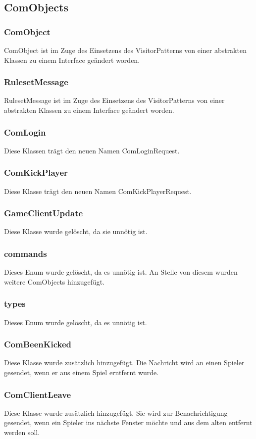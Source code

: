 \documentclass[twoside]{article}
\begin{document}
\subsection{ComObjects}
\subsubsection{ComObject}
ComObject ist im Zuge des Einsetzens des VisitorPatterns von einer abstrakten Klassen zu einem Interface geändert worden.
\subsubsection{RulesetMessage}
RulesetMessage ist im Zuge des Einsetzens des VisitorPatterns von einer abstrakten Klassen zu einem Interface geändert worden.
\subsubsection{ComLogin}
Diese Klassen trägt den neuen Namen ComLoginRequest.
\subsubsection{ComKickPlayer}
Diese Klasse trägt den neuen Namen ComKickPlayerRequest.
\subsubsection{GameClientUpdate}
Diese Klasse wurde gelöscht, da sie unnötig ist.
\subsubsection{commands}
Dieses Enum wurde gelöscht, da es unnötig ist. An Stelle von diesem wurden weitere ComObjects hinzugefügt.
\subsubsection{types}
Dieses Enum wurde gelöscht, da es unnötig ist.
\subsubsection{ComBeenKicked}
Diese Klasse wurde zusätzlich hinzugefügt. Die Nachricht wird an einen Spieler gesendet, wenn er aus einem Spiel erntfernt wurde.
\subsubsection{ComClientLeave}
Diese Klasse wurde zusätzlich hinzugefügt. Sie wird zur Benachrichtigung gesendet, wenn ein Spieler ins nächste Fenster möchte und aus dem alten entfernt werden soll.
\end{document}
